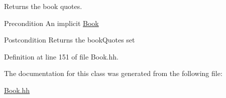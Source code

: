 Returns the book quotes. 

\begin{DoxyPrecond}{Precondition}
An implicit \hyperlink{class_book}{Book} 
\end{DoxyPrecond}
\begin{DoxyPostcond}{Postcondition}
Returns the book\+Quotes set 
\end{DoxyPostcond}


Definition at line 151 of file Book.\+hh.



The documentation for this class was generated from the following file\+:\begin{DoxyCompactItemize}
\item 
\hyperlink{_book_8hh}{Book.\+hh}\end{DoxyCompactItemize}
